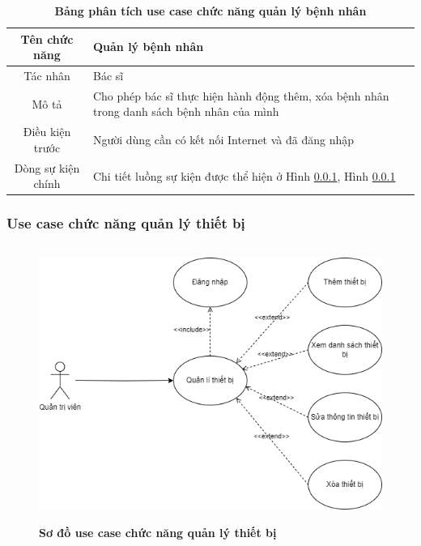   \begin{table}[H]
    \caption{\bfseries \fontsize{12pt}{0pt}\selectfont Bảng phân tích use case chức năng quản lý bệnh nhân}
    \centering
    \begin{tabularx}{0.9\textwidth}{|c|X|}
      \hline
      \textbf{Tên chức năng} & \textbf{Quản lý bệnh nhân} \\
      \hline
      Tác nhân & Bác sĩ \\
      \hline
      Mô tả & Cho phép bác sĩ thực hiện hành động thêm, xóa bệnh nhân trong danh sách bệnh nhân của mình \\
      \hline
      Điều kiện trước & Người dùng cần có kết nối Internet và đã đăng nhập \\
      \hline
      Dòng sự kiện chính & 
        Chi tiết luồng sự kiện được thể hiện ở Hình \ref{}, Hình \ref{} 
        \\
      \hline
    \end{tabularx}
  \end{table}

\subsubsection{Use case chức năng quản lý thiết bị}
  \begin{figure}[H]
    \centering
    \includegraphics[width=14.2cm,height=9cm]{Images/use_case/use_case_manage_device.png}
    \caption[Sơ đồ use case chức năng quản lý thiết bị]{\bfseries \fontsize{12pt}{0pt}
    \selectfont Sơ đồ use case chức năng quản lý thiết bị}
    \label{use_case_device_management} %
  \end{figure}

